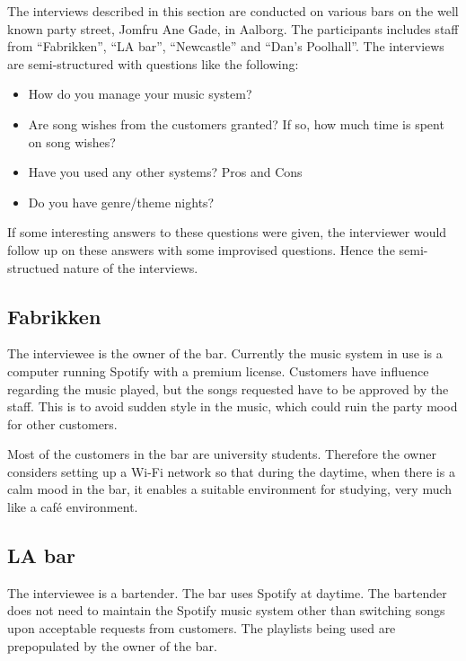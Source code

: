 \label{interviews}
The interviews described in this section are conducted on various bars on the well known party street, Jomfru Ane Gade, in Aalborg. The participants includes staff from \enquote{Fabrikken}, \enquote{LA bar}, \enquote{Newcastle} and \enquote{Dan's Poolhall}. The interviews are semi-structured with questions like the following:

\begin{itemize}
  \item How do you manage your music system?
  \item Are song wishes from the customers granted? If so, how much time is spent on song wishes?
  \item Have you used any other systems? Pros and Cons
  \item Do you have genre/theme nights?
\end{itemize}

If some interesting answers to these questions were given, the interviewer would follow up on these answers with some improvised questions. Hence the semi-structued nature of the interviews.

\subsection{Fabrikken}
\label{sub:fabrikken}

The interviewee is the owner of the bar. Currently the music system in use is a computer running Spotify with a premium license. Customers have influence regarding the music played, but the songs requested have to be approved by the staff. This is to avoid sudden style in the music, which could ruin the party mood for other customers.

Most of the customers in the bar are university students. Therefore the owner considers setting up a Wi-Fi network so that during the daytime, when there is a calm mood in the bar, it enables a suitable environment for studying, very much like a café environment.

\subsection{LA bar}
\label{sub:la_bar}

The interviewee is a bartender. The bar uses Spotify at daytime. The bartender does not need to maintain the Spotify music system other than switching songs upon acceptable requests from customers. The playlists being used are prepopulated by the owner of the bar.


